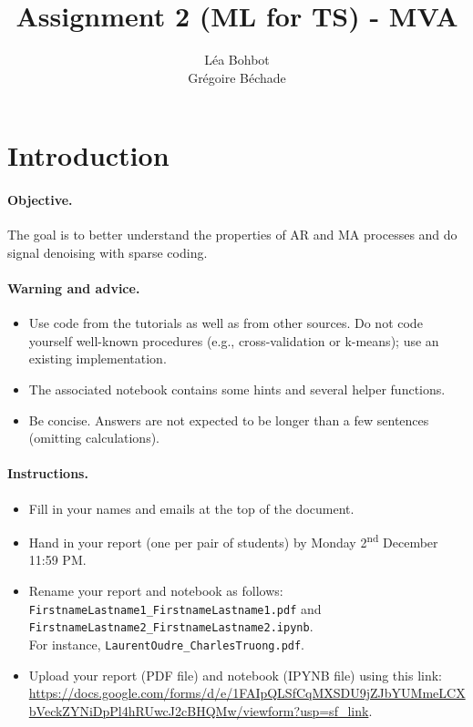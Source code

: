 \documentclass[11pt]{article}
\title{Assignment 2 (ML for TS) - MVA}
\author{
Léa Bohbot \email{lea.bohbot@polytechnique.edu} \\ %
Grégoire Béchade \email{gregoire.bechade@gmail.com} %
}
\begin{document}
\maketitle

\section{Introduction}

\paragraph{Objective.} The goal is to better understand the properties of AR and MA processes and do signal denoising with sparse coding.

\paragraph{Warning and advice.} 
\begin{itemize}
    \item Use code from the tutorials as well as from other sources. Do not code yourself well-known procedures (e.g., cross-validation or k-means); use an existing implementation. 
    \item The associated notebook contains some hints and several helper functions.
    \item Be concise. Answers are not expected to be longer than a few sentences (omitting calculations).
\end{itemize}



\paragraph{Instructions.}
\begin{itemize}
    \item Fill in your names and emails at the top of the document.
    \item Hand in your report (one per pair of students) by Monday 2\textsuperscript{nd} December 11:59 PM.
    \item Rename your report and notebook as follows:\\ \texttt{FirstnameLastname1\_FirstnameLastname1.pdf} and\\ \texttt{FirstnameLastname2\_FirstnameLastname2.ipynb}.\\
    For instance, \texttt{LaurentOudre\_CharlesTruong.pdf}.
    \item Upload your report (PDF file) and notebook (IPYNB file) using this link: \href{https://docs.google.com/forms/d/e/1FAIpQLSfCqMXSDU9jZJbYUMmeLCXbVeckZYNiDpPl4hRUwcJ2cBHQMw/viewform?usp=sf_link}{https://docs.google.com/forms/d/e/1FAIpQLSfCqMXSDU9jZJbYUMmeLCXbVeckZYNiDpPl4hRUwcJ2cBHQMw/viewform?usp=sf\_link}.
\end{itemize}
\end{document}
